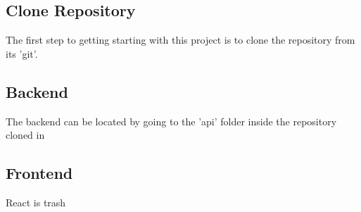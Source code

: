 \subsection{Clone Repository}

The first step to getting starting with this project is to clone the 
repository from its 'git'.

\subsection{Backend}

The backend can be located by going to the 'api' folder inside the
repository cloned in 

\subsection{Frontend}

React is trash